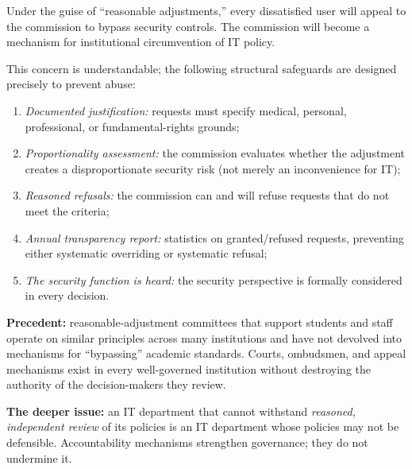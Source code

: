 \bigskip

\begin{clarificationbox}
Under the guise of ``reasonable adjustments,'' every dissatisfied user will appeal to the commission to bypass security controls. The commission will become a mechanism for institutional circumvention of IT policy.
\end{clarificationbox}

\begin{answerbox}[Answer to Q6.2]
This concern is understandable; the following structural safeguards are designed precisely to prevent abuse:

\begin{enumerate}[nosep]
    \item \emph{Documented justification:} requests must specify medical, personal, professional, or fundamental-rights grounds;
    \item \emph{Proportionality assessment:} the commission evaluates whether the adjustment creates a disproportionate security risk (not merely an inconvenience for IT);
    \item \emph{Reasoned refusals:} the commission can and will refuse requests that do not meet the criteria;
    \item \emph{Annual transparency report:} statistics on granted/refused requests, preventing either systematic overriding or systematic refusal;
    \item \emph{The security function is heard:} the security perspective is formally considered in every decision.
\end{enumerate}

\noindent\textbf{Precedent:} reasonable-adjustment committees that support students and staff operate on similar principles across many institutions and have not devolved into mechanisms for ``bypassing'' academic standards. Courts, ombudsmen, and appeal mechanisms exist in every well-governed institution without destroying the authority of the decision-makers they review.

\medskip\noindent\textbf{The deeper issue:} an IT department that cannot withstand \emph{reasoned, independent review} of its policies is an IT department whose policies may not be defensible. Accountability mechanisms strengthen governance; they do not undermine it.
\end{answerbox}

\bigskip

